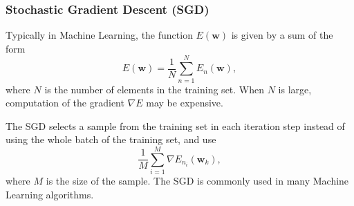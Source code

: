 \documentclass[
]{article}
\begin{document}
\hypertarget{stochastic-gradient-descent-sgd}{%
\subsubsection{Stochastic Gradient Descent
(SGD)}\label{stochastic-gradient-descent-sgd}}

Typically in Machine Learning, the function \(E({\boldsymbol{w}})\) is
given by a sum of the form
\[ E({\boldsymbol{w}}) = \frac 1 N \sum_{n=1}^N E_n({\boldsymbol{w}}), \]
where \(N\) is the number of elements in the training set. When \(N\) is
large, computation of the gradient \(\nabla E\) may be expensive.

The SGD selects a sample from the training set in each iteration step
instead of using the whole batch of the training set, and use
\[ \frac 1 M \sum_{i=1}^M \nabla E_{n_i}({\boldsymbol{w}}_k) ,\] where
\(M\) is the size of the sample. The SGD is commonly used in many
Machine Learning algorithms.
\end{document}
